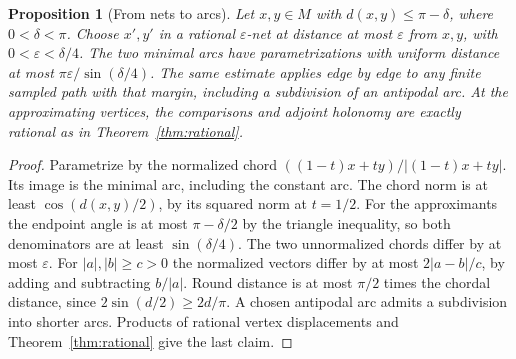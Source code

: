 \documentclass[11pt,reqno]{amsart}
\newtheorem{proposition}[theorem]{Proposition}
\theoremstyle{definition}
\theoremstyle{remark}
\numberwithin{equation}{section}
\begin{document}
\begin{proposition}[From nets to arcs]\label{m6:arcs}
Let \(x,y\in M\) with \(d(x,y)\le\pi-\delta\), where \(0<\delta<\pi\).
Choose \(x',y'\) in a rational \(\varepsilon\)-net at distance at most
\(\varepsilon\) from \(x,y\), with \(0<\varepsilon<\delta/4\).
The two minimal arcs have parametrizations with uniform distance
at most \(\pi\varepsilon/\sin(\delta/4)\). The same estimate applies
edge by edge to any finite sampled path with that margin, including
a subdivision of an antipodal arc. At the approximating vertices,
the comparisons and adjoint holonomy are exactly rational as in
Theorem~\ref{thm:rational}.
\end{proposition}
\begin{proof}
Parametrize by the normalized chord \(((1-t)x+ty)/|(1-t)x+ty|\).
Its image is the minimal arc, including the constant arc. The chord
norm is at least \(\cos(d(x,y)/2)\), by its squared norm at
\(t=1/2\). For the approximants the endpoint angle is at most
\(\pi-\delta/2\) by the triangle inequality, so both denominators
are at least \(\sin(\delta/4)\). The two unnormalized chords differ
by at most \(\varepsilon\). For \(|a|,|b|\ge c>0\) the normalized
vectors differ by at most \(2|a-b|/c\), by adding and subtracting
\(b/|a|\). Round distance is at most \(\pi/2\) times the chordal
distance, since \(2\sin(d/2)\ge2d/\pi\). A chosen antipodal arc
admits a subdivision into shorter arcs. Products of rational
vertex displacements and Theorem~\ref{thm:rational} give the last claim.
\end{proof}
\end{document}

